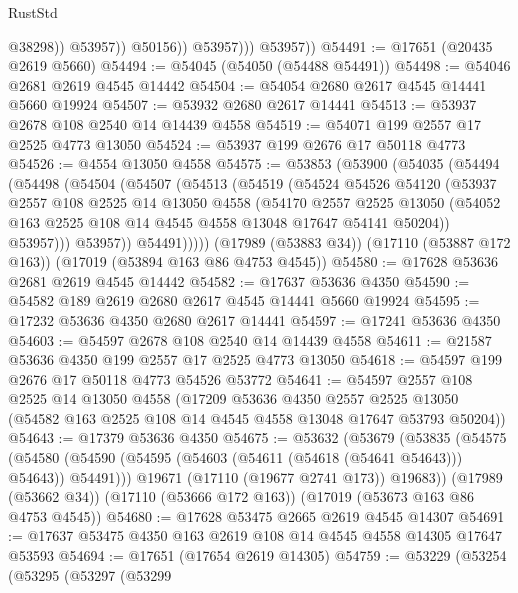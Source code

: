 \begin{lexlean}{RustStd}
\begin{coremodule}
                          @38298))
                      @53957))
                  @50156))
              @53957)))
        @53957))
@54491 := @17651 (@20435 @2619 @5660)
@54494 := @54045 (@54050 (@54488 @54491))
@54498 := @54046 @2681 @2619 @4545 @14442
@54504 := @54054 @2680 @2617 @4545 @14441 @5660 @19924
@54507 := @53932 @2680 @2617 @14441
@54513 := @53937 @2678 @108 @2540 @14 @14439 @4558
@54519 := @54071 @199 @2557 @17 @2525 @4773 @13050
@54524 := @53937 @199 @2676 @17 @50118 @4773
@54526 := @4554 @13050 @4558
@54575 := @53853
    (@53900
      (@54035
        (@54494
          (@54498
            (@54504
              (@54507
                (@54513
                  (@54519
                    (@54524
                      @54526
                      @54120
                      (@53937
                        @2557
                        @108
                        @2525
                        @14
                        @13050
                        @4558
                        (@54170
                          @2557
                          @2525
                          @13050
                          (@54052 @163 @2525 @108 @14 @4545 @4558 @13048 @17647 @54141 @50204))
                        @53957)))
                  @53957))
              @54491)))))
    (@17989 (@53883 @34))
    (@17110 (@53887 @172 @163))
    (@17019 (@53894 @163 @86 @4753 @4545))
@54580 := @17628 @53636 @2681 @2619 @4545 @14442
@54582 := @17637 @53636 @4350
@54590 := @54582 @189 @2619 @2680 @2617 @4545 @14441 @5660 @19924
@54595 := @17232 @53636 @4350 @2680 @2617 @14441
@54597 := @17241 @53636 @4350
@54603 := @54597 @2678 @108 @2540 @14 @14439 @4558
@54611 := @21587 @53636 @4350 @199 @2557 @17 @2525 @4773 @13050
@54618 := @54597 @199 @2676 @17 @50118 @4773 @54526 @53772
@54641 := @54597
    @2557
    @108
    @2525
    @14
    @13050
    @4558
    (@17209
      @53636
      @4350
      @2557
      @2525
      @13050
      (@54582 @163 @2525 @108 @14 @4545 @4558 @13048 @17647 @53793 @50204))
@54643 := @17379 @53636 @4350
@54675 := @53632
    (@53679
      (@53835
        (@54575 (@54580 (@54590 (@54595 (@54603 (@54611 (@54618 (@54641 @54643))) @54643)) @54491)))
        @19671
        (@17110 (@19677 @2741 @173))
        @19683))
    (@17989 (@53662 @34))
    (@17110 (@53666 @172 @163))
    (@17019 (@53673 @163 @86 @4753 @4545))
@54680 := @17628 @53475 @2665 @2619 @4545 @14307
@54691 := @17637 @53475 @4350 @163 @2619 @108 @14 @4545 @4558 @14305 @17647 @53593
@54694 := @17651 (@17654 @2619 @14305)
@54759 := @53229
    (@53254
      (@53295
        (@53297
          (@53299

\end{coremodule}
\end{lexlean}
